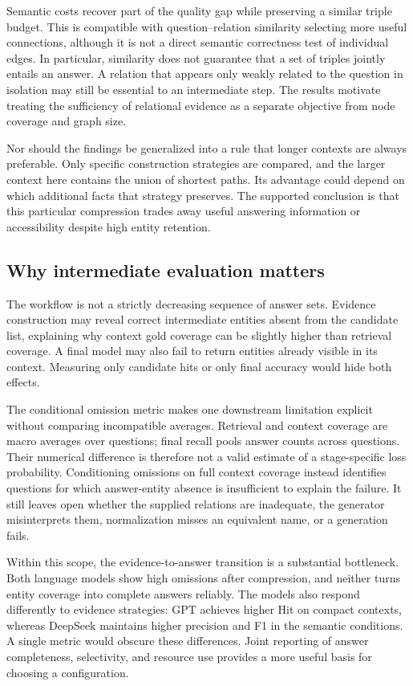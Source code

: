\documentclass[10pt]{article}
\begin{document}
Semantic costs recover part of the quality gap while preserving a similar triple budget. This is compatible with question--relation similarity selecting more useful connections, although it is not a direct semantic correctness test of individual edges. In particular, similarity does not guarantee that a set of triples jointly entails an answer. A relation that appears only weakly related to the question in isolation may still be essential to an intermediate step. The results motivate treating the sufficiency of relational evidence as a separate objective from node coverage and graph size.

Nor should the findings be generalized into a rule that longer contexts are always preferable. Only specific construction strategies are compared, and the larger context here contains the union of shortest paths. Its advantage could depend on which additional facts that strategy preserves. The supported conclusion is that this particular compression trades away useful answering information or accessibility despite high entity retention.

\subsection{Why intermediate evaluation matters}

The workflow is not a strictly decreasing sequence of answer sets. Evidence construction may reveal correct intermediate entities absent from the candidate list, explaining why context gold coverage can be slightly higher than retrieval coverage. A final model may also fail to return entities already visible in its context. Measuring only candidate hits or only final accuracy would hide both effects.

The conditional omission metric makes one downstream limitation explicit without comparing incompatible averages. Retrieval and context coverage are macro averages over questions; final recall pools answer counts across questions. Their numerical difference is therefore not a valid estimate of a stage-specific loss probability. Conditioning omissions on full context coverage instead identifies questions for which answer-entity absence is insufficient to explain the failure. It still leaves open whether the supplied relations are inadequate, the generator misinterprets them, normalization misses an equivalent name, or a generation fails.

Within this scope, the evidence-to-answer transition is a substantial bottleneck. Both language models show high omissions after compression, and neither turns entity coverage into complete answers reliably. The models also respond differently to evidence strategies: GPT achieves higher Hit on compact contexts, whereas DeepSeek maintains higher precision and F1 in the semantic conditions. A single metric would obscure these differences. Joint reporting of answer completeness, selectivity, and resource use provides a more useful basis for choosing a configuration.
\end{document}
